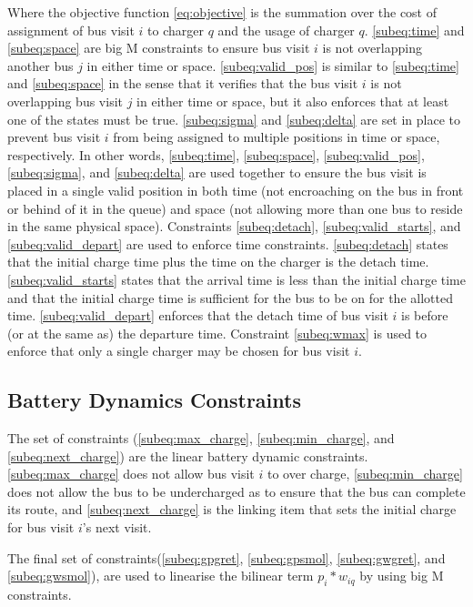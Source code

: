 \documentclass[letterpaper, 10pt, conference]{IEEEtran}
\begin{document}
Where the objective function \eqref{eq:objective} is the summation over the cost of assignment of bus visit \(i\) to charger \(q\) and the usage of charger \(q\). \eqref{subeq:time} and \eqref{subeq:space} are big M constraints to ensure bus visit \(i\) is not overlapping another bus \(j\) in either time or space. \eqref{subeq:valid_pos} is similar to \eqref{subeq:time} and \eqref{subeq:space} in the sense that it verifies that the bus visit \(i\) is not overlapping bus visit \(j\) in either time or space, but it also enforces that at least one of the states must be true. \eqref{subeq:sigma} and \eqref{subeq:delta} are set in place to prevent bus visit \(i\) from being assigned to multiple positions in time or space, respectively. In other words, \eqref{subeq:time}, \eqref{subeq:space}, \eqref{subeq:valid_pos}, \eqref{subeq:sigma}, and \eqref{subeq:delta} are used together to ensure the bus visit is placed in a single valid position in both time (not encroaching on the bus in front or behind of it in the queue) and space (not allowing more than one bus to reside in the same physical space).
 Constraints \eqref{subeq:detach}, \eqref{subeq:valid_starts}, and \eqref{subeq:valid_depart} are used to enforce time constraints. \eqref{subeq:detach} states that the initial charge time plus the time on the charger is the detach time. \eqref{subeq:valid_starts} states that the arrival time is less than the initial charge time and that the initial charge time is sufficient for the bus to be on for the allotted time. \eqref{subeq:valid_depart} enforces that the detach time of bus visit \(i\) is before (or at the same as) the departure time. Constraint \eqref{subeq:wmax} is used to enforce that only a single charger may be chosen for bus visit \(i\).

\subsection{Battery Dynamics Constraints}
The set of constraints (\eqref{subeq:max_charge}, \eqref{subeq:min_charge}, and \eqref{subeq:next_charge}) are the linear battery dynamic constraints. \eqref{subeq:max_charge} does not allow bus visit \(i\) to over charge, \eqref{subeq:min_charge} does not allow the bus to be undercharged as to ensure that the bus can complete its route, and \eqref{subeq:next_charge} is the linking item that sets the initial charge for bus visit \(i\)'s next visit.

The final set of constraints(\eqref{subeq:gpgret}, \eqref{subeq:gpsmol}, \eqref{subeq:gwgret}, and \eqref{subeq:gwsmol}), are used to linearise the bilinear term \(p_i*w_{iq}\) by using big M constraints.
\end{document}
